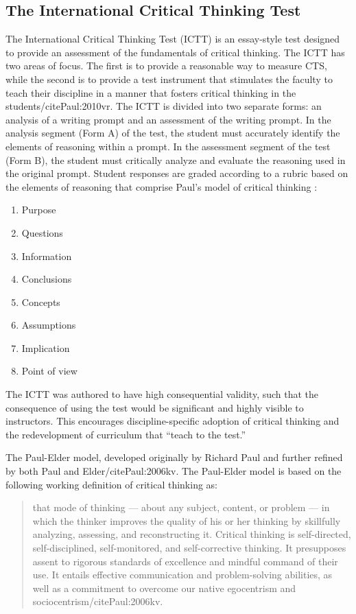 \subsection{The International Critical Thinking Test}

The International Critical Thinking Test (ICTT) is an essay-style test designed to provide an assessment of the fundamentals of critical thinking. The ICTT has two areas of focus. The first is to provide a reasonable way to measure CTS, while the second is to provide a test instrument that stimulates the faculty to teach their discipline in a manner that fosters critical thinking in the students/cite{Paul:2010vr}. The ICTT is divided into two separate forms: an analysis of a writing prompt and an assessment of the writing prompt. In the analysis segment (Form A) of the test, the student must accurately identify the elements of reasoning within a prompt. In the assessment segment of the test (Form B), the student must critically analyze and evaluate the reasoning used in the original prompt. Student responses are graded according to a rubric based on the elements of reasoning that comprise Paul’s model of critical thinking \cite{Paul:2006kv}:

\begin{enumerate}
\item Purpose
\item Questions
\item Information
\item Conclusions
\item Concepts
\item Assumptions
\item Implication
\item Point of view
\end{enumerate}

The ICTT was authored to have high consequential validity, such that the consequence of using the test would be significant and highly visible to instructors\cite{Paul:2007um}. This encourages discipline-specific adoption of critical thinking and the redevelopment of curriculum that “teach to the test.”

The Paul-Elder model, developed originally by Richard Paul and further refined by both Paul and Elder/cite{Paul:2006kv}. The Paul-Elder model is based on the following working definition of critical thinking as:

\begin{quote}
that mode of thinking — about any subject, content, or problem — in which the thinker improves the quality of his or her thinking by skillfully analyzing, assessing, and reconstructing it. Critical thinking is self-directed, self-disciplined, self-monitored, and self-corrective thinking. It presupposes assent to rigorous standards of excellence and mindful command of their use. It entails effective communication and problem-solving abilities, as well as a commitment to overcome our native egocentrism and sociocentrism/cite{Paul:2006kv}.
\end{quote}

